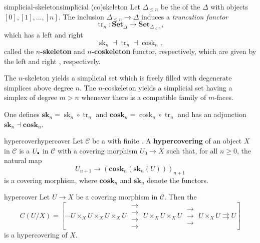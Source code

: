 \begin{topic}{simplicial-skeleton}{simplicial (co)skeleton}
    Let $\Delta_{\le n}$ be the  of the  $\Delta$ with objects $[0], [1], \ldots, [n]$. The inclusion $\Delta_{\le n} \to \Delta$ induces a \textit{truncation functor}
    \[ \operatorname{tr}_n \colon \textbf{Set}_\Delta \to \textbf{Set}_{\Delta_{\le n}} , \]
    which has a left and right 
    \[ \operatorname{sk}_n \dashv \operatorname{tr}_n \dashv \operatorname{cosk}_n , \]
    called the \textbf{$n$-skeleton} and \textbf{$n$-coskeleton} functor, respectively, which are given by the left and right , respectively.
    
    The $n$-skeleton yields a simplicial set which is freely filled with degenerate simplices above degree $n$. The $n$-coskeleton yields a simplicial set having a simplex of degree $m > n$ whenever there is a compatible family of $m$-faces.
    
    One defines $\textbf{sk}_n = \operatorname{sk}_n \circ \operatorname{tr}_n$ and $\textbf{cosk}_n = \operatorname{cosk}_n \circ \operatorname{tr}_n$ and has an adjunction $\textbf{sk}_n \dashv \textbf{cosk}_n$.
\end{topic}

\begin{topic}{hypercover}{hypercover}
    Let $\mathcal{C}$ be a  with finite . A \textbf{hypercovering} of an object $X$ in $\mathcal{C}$ is a  $U_\bdot$ in $\mathcal{C}$ with a covering morphism $U_0 \to X$ such that, for all $n \ge 0$, the natural map
    \[ U_{n + 1} \to (\textbf{cosk}_n(\textbf{sk}_n(U)))_{n + 1} \]
    is a covering morphism, where $\textbf{cosk}_n$ and $\textbf{sk}_n$ denote the  functors.
\end{topic}

\begin{example}{hypercover}
    Let $U \to X$ be a covering morphism in $\mathcal{C}$. Then the 
    \[ C(U/X) = \left[ \cdots U \times_X U \times_X U \times_X U \; \substack{\rightarrow \\[-0.9em] \rightarrow \\[-0.9em] \rightarrow \\[-0.9em] \rightarrow} \; U \times_X U \times_X U \; \substack{\rightarrow \\[-0.9em] \rightarrow \\[-0.9em] \rightarrow} \; U \times_X U \rightrightarrows U \right] \]
    is a hypercovering of $X$.
\end{example}
